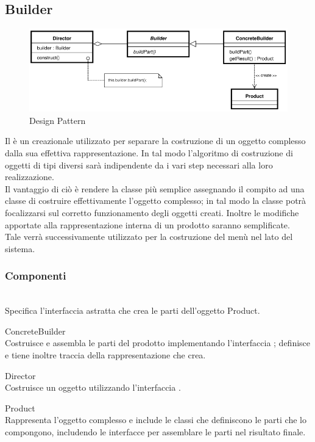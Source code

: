 \documentclass[a4paper, titlepage]{article}
\begin{document}
\subsection{Builder}
\begin{figure}[htp]
\centering
\includegraphics[scale=0.60]{Img/builder.png}
\caption{Design Pattern }
\label{}
\end{figure}
Il  è un  creazionale utilizzato per separare la costruzione di un oggetto complesso dalla sua effettiva rappresentazione. In tal modo l'algoritmo di costruzione di oggetti di tipi diversi sarà indipendente da i vari step necessari alla loro realizzazione.
\\ Il vantaggio di ciò è rendere la classe più semplice assegnando il compito ad una classe  di costruire effettivamente l'oggetto complesso; in tal modo la classe potrà focalizzarsi sul corretto funzionamento degli oggetti creati.
Inoltre le modifiche apportate alla rappresentazione interna di un prodotto saranno semplificate.
\\ Tale  verrà successivamente utilizzato per la costruzione del menù nel lato  del sistema.

\subsubsection{Componenti}
\begin{description}\item{}
\\ Specifica l'interfaccia astratta che crea le parti dell'oggetto Product.
\item {ConcreteBuilder} 
\\Costruisce e assembla le parti del prodotto implementando l'interfaccia ; definisce e tiene inoltre traccia della rappresentazione che crea.
\item{Director} 
\\Costruisce un oggetto utilizzando l'interfaccia .
\item{Product} 
\\Rappresenta l'oggetto complesso e include le classi che definiscono le parti che lo compongono, includendo le interfacce per assemblare le parti nel risultato finale.
\end{description}
\end{document}
